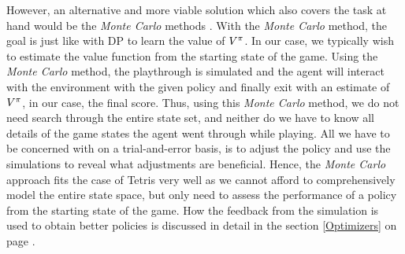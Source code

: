 However, an alternative and more viable solution
which also covers the task at hand would be the \textit{Monte Carlo} methods \citep{Csaba}. 
With the \textit{Monte Carlo} method, the goal is just like with DP
to learn
the value of $V^{\pi}$. In our case, 
we typically wish to estimate the value function from the starting 
state of the game. Using the \textit{Monte Carlo} method, the playthrough is simulated 
and the agent will interact with the environment with the given policy
and finally exit with an estimate of $V^{\pi}$,
in our case, the final score. Thus, using this \textit{Monte Carlo} method, we do not need search 
through the entire state set, and neither do we have to know all
details of the game states the agent went through while playing.
All we have to be concerned with on a trial-and-error basis, is to
adjust the policy and use the simulations to reveal what adjustments 
are beneficial.
Hence, the \textit{Monte Carlo} approach fits the case of Tetris
very well as we cannot afford to comprehensively  model the entire 
state space, but only need to assess the performance of a policy from the 
starting state of the game.
How the feedback from the simulation is used to obtain better policies
is discussed in detail in the section 
\ref{Optimizers} on page \pageref{Optimizers}.










 


